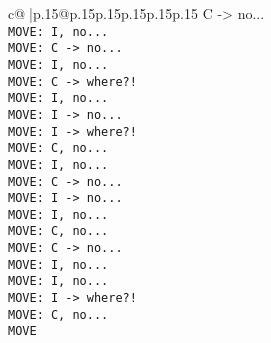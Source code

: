 \documentclass{article}
\begin{document}
{\begin{supertabular}{c@{$\;$}|p{.15\linewidth}@{}p{.15\linewidth}p{.15\linewidth}p{.15\linewidth}p{.15\linewidth}p{.15\linewidth}}
{{{ C -> no...\\ \tt  MOVE: I, no...\\ \tt  MOVE: C -> no...\\ \tt  MOVE: I, no...\\ \tt  MOVE: C -> where?!\\ \tt  MOVE: I, no...\\ \tt  MOVE: I -> no...\\ \tt  MOVE: I -> where?!\\ \tt  MOVE: C, no...\\ \tt  MOVE: I, no...\\ \tt  MOVE: C -> no...\\ \tt  MOVE: I -> no...\\ \tt  MOVE: I, no...\\ \tt  MOVE: C, no...\\ \tt  MOVE: C -> no...\\ \tt  MOVE: I, no...\\ \tt  MOVE: I, no...\\ \tt  MOVE: I -> where?!\\ \tt  MOVE: C, no...\\ \tt  MOVE}}}
\end{supertabular}}
\end{document}
